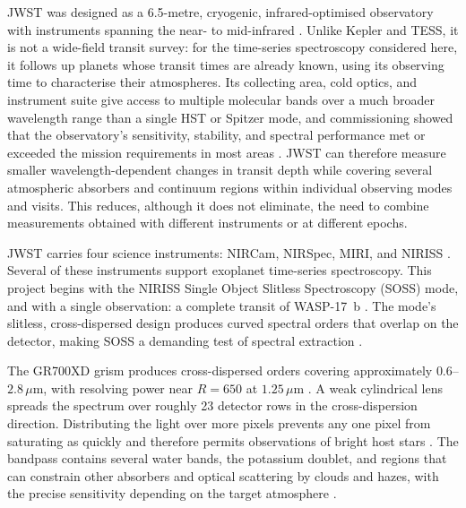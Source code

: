 JWST was designed as a 6.5-metre, cryogenic, infrared-optimised observatory with
instruments spanning the near- to mid-infrared
\citep{GardnerEtAl2006}. Unlike Kepler and TESS, it is not a wide-field transit
survey: for the time-series spectroscopy considered here, it follows up
planets whose transit times are already known, using its observing time to
characterise their atmospheres. Its collecting area, cold optics, and
instrument suite give access to multiple molecular bands over a much broader
wavelength range than a single HST or Spitzer mode, and commissioning showed
that the observatory's sensitivity, stability, and spectral performance met or
exceeded the mission requirements in most areas \citep{RigbyEtAl2023}. JWST
can therefore measure smaller wavelength-dependent changes in transit depth
while covering several atmospheric absorbers and continuum regions within
individual observing modes and visits. This reduces, although it does not
eliminate, the need to combine measurements obtained with different
instruments or at different epochs.


JWST carries four science instruments: NIRCam, NIRSpec, MIRI, and NIRISS
\citep{GardnerEtAl2006,AlbertEtAl2023}. Several of these instruments support
exoplanet time-series spectroscopy. This project begins with the NIRISS Single
Object Slitless Spectroscopy (SOSS) mode, and with a single observation: a
complete transit of WASP-17~b \citep{LouieEtAl2025}. The mode's slitless,
cross-dispersed design produces curved spectral orders that overlap on the
detector, making SOSS a demanding test of spectral extraction
\citep{AlbertEtAl2023}.

The GR700XD grism produces cross-dispersed orders covering approximately
$0.6$--$2.8\,\mu\mathrm{m}$, with resolving power near $R=650$ at
$1.25\,\mu\mathrm{m}$ \citep{AlbertEtAl2023}. A weak cylindrical lens spreads
the spectrum over roughly 23 detector rows in the cross-dispersion direction.
Distributing the light over more pixels prevents any one pixel from saturating
as quickly and therefore permits observations of bright host stars
\citep{AlbertEtAl2023}. The bandpass contains several water bands, the
potassium doublet, and regions that can constrain other absorbers and optical
scattering by clouds and hazes, with the precise sensitivity depending on the
target atmosphere
\citep{AlbertEtAl2023,HolmbergMadhusudhan2023,LouieEtAl2025}.


